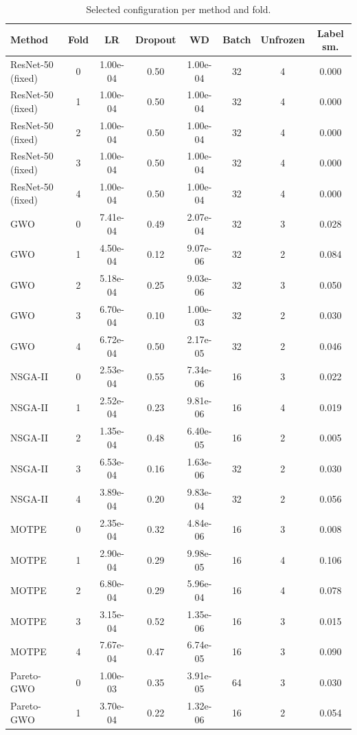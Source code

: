 \begin{table}[t]
\centering
\caption{Selected configuration per method and fold.}
\label{tab:table10_selected_configs}
\small
\begin{tabular}{lccccccc}
\toprule
Method & Fold & LR & Dropout & WD & Batch & Unfrozen & Label sm. \\
\midrule
ResNet-50 (fixed) & 0 & 1.00e-04 & 0.50 & 1.00e-04 & 32 & 4 & 0.000 \\
ResNet-50 (fixed) & 1 & 1.00e-04 & 0.50 & 1.00e-04 & 32 & 4 & 0.000 \\
ResNet-50 (fixed) & 2 & 1.00e-04 & 0.50 & 1.00e-04 & 32 & 4 & 0.000 \\
ResNet-50 (fixed) & 3 & 1.00e-04 & 0.50 & 1.00e-04 & 32 & 4 & 0.000 \\
ResNet-50 (fixed) & 4 & 1.00e-04 & 0.50 & 1.00e-04 & 32 & 4 & 0.000 \\
GWO & 0 & 7.41e-04 & 0.49 & 2.07e-04 & 32 & 3 & 0.028 \\
GWO & 1 & 4.50e-04 & 0.12 & 9.07e-06 & 32 & 2 & 0.084 \\
GWO & 2 & 5.18e-04 & 0.25 & 9.03e-06 & 32 & 3 & 0.050 \\
GWO & 3 & 6.70e-04 & 0.10 & 1.00e-03 & 32 & 2 & 0.030 \\
GWO & 4 & 6.72e-04 & 0.50 & 2.17e-05 & 32 & 2 & 0.046 \\
NSGA-II & 0 & 2.53e-04 & 0.55 & 7.34e-06 & 16 & 3 & 0.022 \\
NSGA-II & 1 & 2.52e-04 & 0.23 & 9.81e-06 & 16 & 4 & 0.019 \\
NSGA-II & 2 & 1.35e-04 & 0.48 & 6.40e-05 & 16 & 2 & 0.005 \\
NSGA-II & 3 & 6.53e-04 & 0.16 & 1.63e-06 & 32 & 2 & 0.030 \\
NSGA-II & 4 & 3.89e-04 & 0.20 & 9.83e-04 & 32 & 2 & 0.056 \\
MOTPE & 0 & 2.35e-04 & 0.32 & 4.84e-06 & 16 & 3 & 0.008 \\
MOTPE & 1 & 2.90e-04 & 0.29 & 9.98e-05 & 16 & 4 & 0.106 \\
MOTPE & 2 & 6.80e-04 & 0.29 & 5.96e-04 & 16 & 4 & 0.078 \\
MOTPE & 3 & 3.15e-04 & 0.52 & 1.35e-06 & 16 & 3 & 0.015 \\
MOTPE & 4 & 7.67e-04 & 0.47 & 6.74e-05 & 16 & 3 & 0.090 \\
Pareto-GWO & 0 & 1.00e-03 & 0.35 & 3.91e-05 & 64 & 3 & 0.030 \\
Pareto-GWO & 1 & 3.70e-04 & 0.22 & 1.32e-06 & 16 & 2 & 0.054 \\

\end{tabular}
\end{table}
